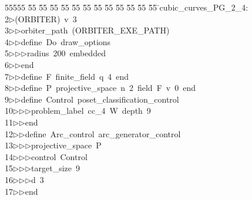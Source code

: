 %
%
\begin{tabbing}
55555 \= 55 \= 55 \= 55 \= 55 \= 55 \= 55 \= 55 \= 55 \= 55 \= 55 \= 55 \= 55 \= \>cubic\_curves\_PG\_2\_4:\\[0pt]
2\>$\triangleright$\>(ORBITER)\ v\ 3\ \\[0pt]
3\>$\triangleright$\>$\triangleright$\>orbiter\_path\ (ORBITER\_EXE\_PATH)\ \\[0pt]
4\>$\triangleright$\>$\triangleright$\>define\ Do\ draw\_options\ \\[0pt]
5\>$\triangleright$\>$\triangleright$\>$\triangleright$\>radius\ 200\ embedded\ \\[0pt]
6\>$\triangleright$\>$\triangleright$\>end\ \\[0pt]
7\>$\triangleright$\>$\triangleright$\>define\ F\ finite\_field\ q\ 4\ end\ \\[0pt]
8\>$\triangleright$\>$\triangleright$\>define\ P\ projective\_space\ n\ 2\ field\ F\ v\ 0\ end\ \\[0pt]
9\>$\triangleright$\>$\triangleright$\>define\ Control\ poset\_classification\_control\ \\[0pt]
10\>$\triangleright$\>$\triangleright$\>$\triangleright$\>problem\_label\ cc\_4\ W\ depth\ 9\ \\[0pt]
11\>$\triangleright$\>$\triangleright$\>end\ \\[0pt]
12\>$\triangleright$\>$\triangleright$\>define\ Arc\_control\ arc\_generator\_control\ \\[0pt]
13\>$\triangleright$\>$\triangleright$\>$\triangleright$\>projective\_space\ P\ \\[0pt]
14\>$\triangleright$\>$\triangleright$\>$\triangleright$\>control\ Control\ \\[0pt]
15\>$\triangleright$\>$\triangleright$\>$\triangleright$\>target\_size\ 9\ \\[0pt]
16\>$\triangleright$\>$\triangleright$\>$\triangleright$\>d\ 3\ \\[0pt]
17\>$\triangleright$\>$\triangleright$\>end\ \\[0pt]

\end{tabbing}
